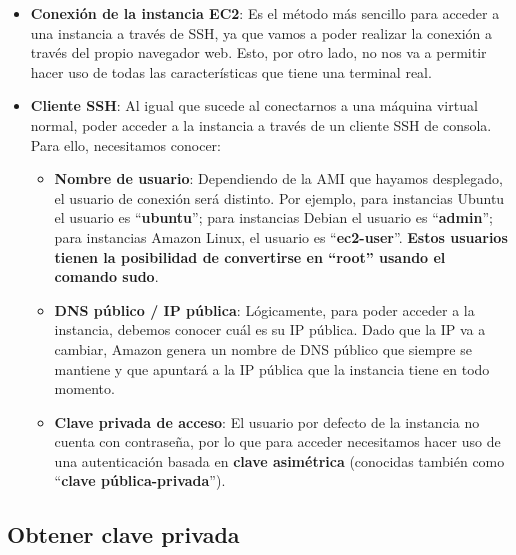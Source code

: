 \begin{itemize}
	\item \textbf{Conexión de la instancia EC2}: Es el método más sencillo para acceder a una instancia a través de SSH, ya que vamos a poder realizar la conexión a través del propio navegador web. Esto, por otro lado, no nos va a permitir hacer uso de todas las características que tiene una terminal real.
	
	\item \textbf{Cliente SSH}: Al igual que sucede al conectarnos a una máquina virtual normal,  poder acceder a la instancia a través de un cliente SSH de consola. Para ello, necesitamos conocer:
	\begin{itemize}
		\item \textbf{Nombre de usuario}: Dependiendo de la AMI que hayamos desplegado, el usuario de conexión será distinto. Por ejemplo, para instancias Ubuntu el usuario es “\textbf{ubuntu}”; para instancias Debian el usuario es “\textbf{admin}”; para instancias Amazon Linux, el usuario es “\textbf{ec2-user}”. \textbf{Estos usuarios tienen la posibilidad de convertirse en “root” usando el comando sudo}.


		\item \textbf{DNS público / IP pública}: Lógicamente, para poder acceder a la instancia, debemos conocer cuál es su IP pública. Dado que la IP va a cambiar, Amazon genera un nombre de DNS público que siempre se mantiene y que apuntará a la IP pública que la instancia tiene en todo momento.
		
		
		\item \textbf{Clave privada de acceso}: El usuario por defecto de la instancia no cuenta con contraseña, por lo que para acceder necesitamos hacer uso de una autenticación basada en \textbf{clave asimétrica} (conocidas también como “\textbf{clave pública-privada}”).
		
		
	\end{itemize}
\end{itemize}


\subsection{Obtener clave privada}

